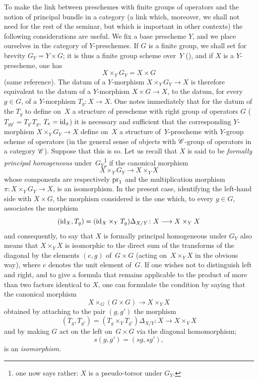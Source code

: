 To make the link between preschemes with finite groups
of operators and the notion of principal bundle in a
category (a link which, moreover, we shall not need for the
rest of the seminar, but which is important in other contexts) the
following considerations are useful. We fix a
base prescheme $Y$, and we place ourselves in the
category of $Y$-preschemes. If $G$ is a finite
group, we shall set for brevity $G_Y=Y \times G$; it is thus a
finite group scheme over~$Y$ (\cf {}), and if $X$ is
a $Y$-prescheme, one has
$$
X \times_Y G_Y = X \times G
$$
(same reference). The datum of a $Y$-morphism $X
\times_Y G_Y \to X$ is therefore equivalent to the datum of a
$Y$-morphism $X \times G \to X$, \ie to the datum, for every
$g \in G$, of a $Y$-morphism $T_g \colon X \to X$. One notes
immediately that for the datum of the $T_g$ to define on~$X$ a structure of prescheme with right group of operators
$G$ (\ie $T_{gg'}=T_{g'}T_g$, $T_e=\mathrm{id}_x$) it is necessary and
sufficient that the corresponding $Y$-morphism $X \times_Y G_Y \to X$
define on~$X$ a structure of~$Y$-prescheme with
$Y$-group scheme of operators (in the general sense
of objects with $\cal{C}$-group of operators in a
category $\cal{C}$). Suppose that this is so. Let us recall that
$X$ is said to be \emph{formally principal homogeneous}
under~$G_Y$\kern1pt\footnote{one now says rather: $X$ is a
pseudo-torsor under $G_Y$.} if the canonical morphism
$$
X \times_Y G_Y \to X \times_Y X
$$
whose components are respectively $\mathrm{pr}_1$ and the
multiplication morphism $\pi \colon X \times_Y G_Y \to X$, is an
isomorphism. In the present case, identifying the left-hand side with $X
\times G$, the morphism considered is the one which, to every $g
\in G$, associates the morphism
$$
(\id_X,T_g)=(\id_X \times_Y T_g)\Delta_{X/Y} \colon X \to X \times_Y X
$$
and consequently, to say that $X$ is formally principal homogeneous
under $G_Y$ also means that $X \times_Y X$ is isomorphic to the
direct sum of the transforms of the diagonal by the
elements $(e,g)$ of~$G \times G$ (acting on~$X \times_Y
X$ in the obvious way), where $e$ denotes the unit
element of~$G$. If one wishes not to distinguish left and right,
and to give a formula that remains applicable to the product of more than two
factors identical to $X$, one can formulate the condition by saying
that the canonical morphism
$$
X \times_G (G \times G) \to X \times_Y X
$$
obtained by attaching to the pair $(g,g')$ the morphism
$$
(T_g,T_{g'})=(T_g \times_Y T_{g'})\Delta_{X/Y} \colon X \to X \times_Y
X
$$
and by making $G$ act on the left on~$G \times G$ via
the diagonal homomorphism;
$$
s(g,g')=(sg,sg'),
$$
is an \emph{isomorphism}.

